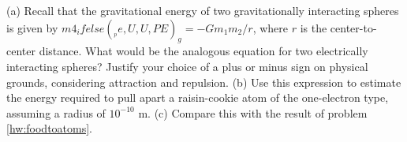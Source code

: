 (a) Recall that the gravitational energy of two gravitationally
interacting spheres is given by $m4_ifelse(__pe,U,U,PE)_g=-Gm_1m_2/r$, where $r$ is the
center-to-center distance. What would be the analogous
equation for two electrically interacting spheres? Justify
your choice of a plus or minus sign on physical grounds,   
considering attraction and repulsion.\answercheck \hwendpart
(b) Use this
expression to estimate the energy required to pull apart a  
raisin-cookie atom of the one-electron type, assuming a
radius of $10^{-10}$ m.\answercheck \hwendpart
(c) Compare this with the result of
problem \ref{hw:foodtoatoms}.
